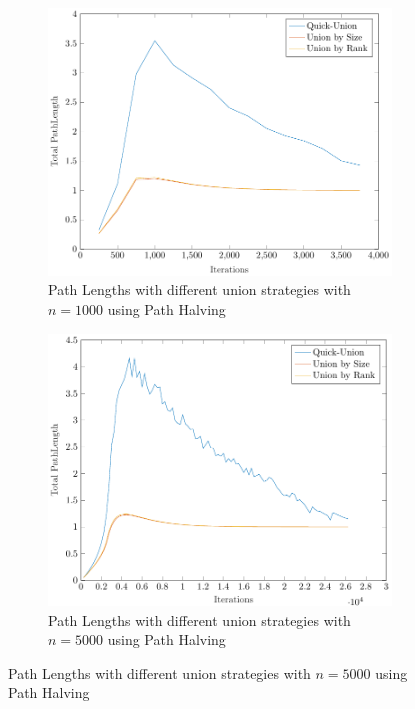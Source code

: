 \begin{figure}[ht]
    \begin{subfigure}{0.32\textwidth}
        \centering
        \includegraphics[width=\textwidth]{../images/plotPHFull1000_PathLength.pdf}
        \caption{Path Lengths with different union strategies with $n = 1000$ using Path Halving}
    \end{subfigure}%
    \hfill
    \begin{subfigure}{0.32\textwidth}
        \centering
        \includegraphics[width=\textwidth]{../images/plotPHFull5000_PathLength.pdf}
        \caption{Path Lengths with different union strategies with $n = 5000$ using Path Halving}
    \end{subfigure}%

\end{figure}
